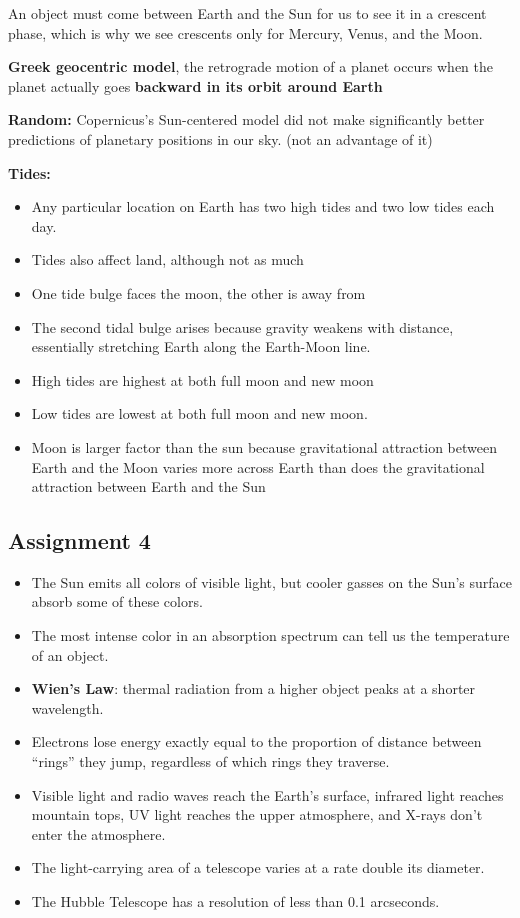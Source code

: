 \documentclass[12pt]{article}
\begin{document}
An object must come between Earth and the Sun for us to see it in a crescent phase, which is why we see crescents only for Mercury, Venus, and the Moon.

{\bf Greek geocentric model}, the retrograde motion of a planet occurs when the planet actually goes {\bf backward in its orbit around Earth }

{\bf Random:} Copernicus's Sun-centered model did not make significantly better predictions of planetary positions in our sky. (not an advantage of it)

{\bf Tides:}
\begin{itemize}
\item Any particular location on Earth has two high tides and two low tides each day.
\item Tides also affect land, although not as much
\item One tide bulge faces the moon, the other is away from
\item The second tidal bulge arises because gravity weakens with distance, essentially stretching Earth along the Earth-Moon line.
\item High tides are highest at both full moon and new moon
\item Low tides are lowest at both full moon and new moon.
\item Moon is larger factor than the sun because gravitational attraction between Earth and the Moon varies more across Earth than does the gravitational attraction between Earth and the Sun
\end{itemize}

\subsection{Assignment 4}
\begin{itemize}
\item The Sun emits all colors of visible light, but cooler gasses on the Sun's surface absorb some of these colors.
\item The most intense color in an absorption spectrum can tell us the temperature of an object.
\item {\bf Wien's Law}: thermal radiation from a higher object peaks at a shorter wavelength.
\item Electrons lose energy exactly equal to the proportion of distance between ``rings'' they jump, regardless of which rings they traverse.
\item Visible light and radio waves reach the Earth's surface, infrared light reaches mountain tops, UV light reaches the upper atmosphere, and X-rays don't enter the atmosphere.
\item The light-carrying area of a telescope varies at a rate double its diameter.
\item The Hubble Telescope has a resolution of less than 0.1 arcseconds.
\end{itemize}
\end{document}
